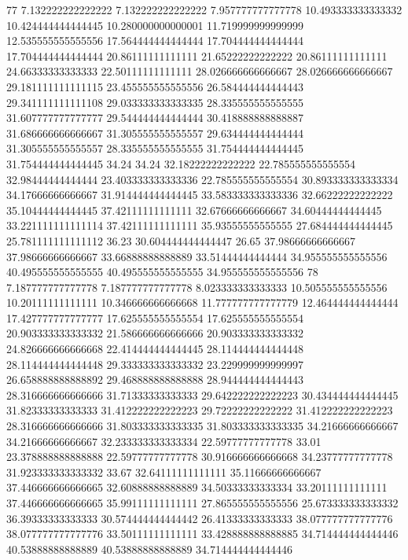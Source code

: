 77 7.132222222222222 7.132222222222222 7.957777777777778 10.493333333333332 10.424444444444445 10.280000000000001 11.719999999999999 12.535555555555556 17.564444444444444 17.704444444444444 17.704444444444444 20.86111111111111 21.65222222222222 20.86111111111111 24.66333333333333 22.50111111111111 28.026666666666667 28.026666666666667 29.181111111111115 23.455555555555556 26.584444444444443 29.341111111111108 29.033333333333335 28.335555555555555 31.607777777777777 29.544444444444444 30.418888888888887 31.686666666666667 31.305555555555557 29.634444444444444 31.305555555555557 28.335555555555555 31.754444444444445 31.754444444444445 34.24 34.24 32.18222222222222 22.785555555555554 32.98444444444444 23.403333333333336 22.785555555555554 30.893333333333334 34.17666666666667 31.914444444444445 33.583333333333336 32.66222222222222 35.10444444444445 37.42111111111111 32.67666666666667 34.60444444444445 33.221111111111114 37.42111111111111 35.93555555555555 27.684444444444445 25.781111111111112 36.23 30.604444444444447 26.65 37.98666666666667 37.98666666666667 33.66888888888889 33.51444444444444 34.955555555555556 40.495555555555555 40.495555555555555 34.955555555555556
78 7.187777777777778 7.187777777777778 8.023333333333333 10.505555555555556 10.20111111111111 10.346666666666668 11.777777777777779 12.464444444444444 17.427777777777777 17.625555555555554 17.625555555555554 20.903333333333332 21.586666666666666 20.903333333333332 24.826666666666668 22.414444444444445 28.114444444444448 28.114444444444448 29.333333333333332 23.229999999999997 26.658888888888892 29.468888888888888 28.944444444444443 28.316666666666666 31.71333333333333 29.642222222222223 30.434444444444445 31.82333333333333 31.412222222222223 29.72222222222222 31.412222222222223 28.316666666666666 31.803333333333335 31.803333333333335 34.21666666666667 34.21666666666667 32.233333333333334 22.59777777777778 33.01 23.378888888888888 22.59777777777778 30.916666666666668 34.23777777777778 31.923333333333332 33.67 32.64111111111111 35.11666666666667 37.446666666666665 32.60888888888889 34.50333333333334 33.20111111111111 37.446666666666665 35.99111111111111 27.865555555555556 25.673333333333332 36.39333333333333 30.574444444444442 26.41333333333333 38.077777777777776 38.077777777777776 33.50111111111111 33.428888888888885 34.714444444444446 40.53888888888889 40.53888888888889 34.714444444444446
